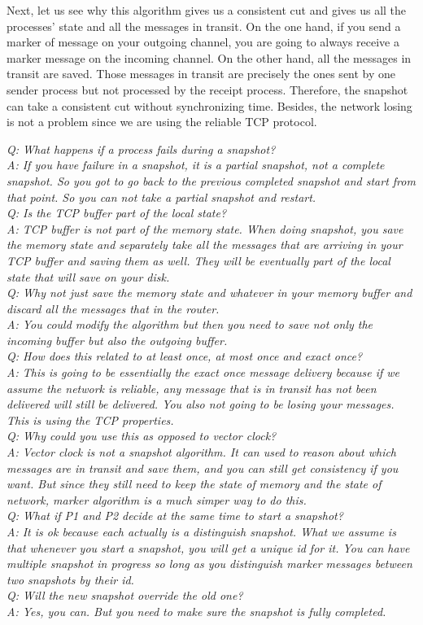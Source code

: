 \documentclass[twoside]{article}
\begin{document}
Next, let us see why this algorithm gives us a consistent cut and gives us all the processes' state and all the messages in transit. On the one hand, if you send a marker of message on your outgoing channel, you are going to always receive a marker message on the incoming channel. On the other hand, all the messages in transit are saved. Those messages in transit are precisely the ones sent by one sender process but not processed by the receipt process. Therefore, the snapshot can take a consistent cut without synchronizing time. Besides, the network losing is not a problem since we are using the reliable TCP protocol.

\textit{Q: What happens if a process fails during a snapshot?\\
A: If you have failure in a snapshot, it is a partial snapshot, not a complete snapshot. So you got to go back to the previous completed snapshot and start from that point. So you can not take a partial snapshot and restart. \\
Q: Is the TCP buffer part of the local state?\\
A: TCP buffer is not part of the memory state. When doing snapshot, you save the memory state and separately take all the messages that are arriving in your TCP buffer and saving them as well. They will be eventually part of the local state that will save on your disk.\\
Q: Why not just save the memory state and whatever in your memory buffer and discard all the messages that in the router.\\
A: You could modify the algorithm but then you need to save not only the incoming buffer but also the outgoing buffer. \\
Q: How does this related to at least once, at most once and exact once?\\
A: This is going to be essentially the exact once message delivery because if we assume the network is reliable, any message that is in transit has not been delivered will still be delivered. You also not going to be losing your messages. This is using the TCP properties.\\
Q: Why could you use this as opposed to vector clock?\\
A: Vector clock is not a snapshot algorithm. It can used to reason about which messages are in transit and save them, and you can still get consistency if you want. But since they still need to keep the state of memory and the state of network, marker algorithm is a much simper way to do this.\\
Q: What if P1 and P2 decide at the same time to start a snapshot? \\
A: It is ok because each actually is a distinguish snapshot. What we assume is that whenever you start a snapshot, you will get a unique id for it. You can have multiple snapshot in progress so long as you distinguish marker messages between two snapshots by their id.\\
Q: Will the new snapshot override the old one?\\
A: Yes, you can. But you need to make sure the snapshot is fully completed.}
\end{document}
